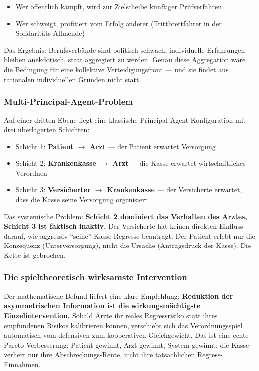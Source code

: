 \documentclass{umbruch-position}
\begin{document}
\begin{itemize}[nosep]
  \item Wer öffentlich kämpft, wird zur Zielscheibe künftiger Prüfverfahren
  \item Wer schweigt, profitiert vom Erfolg anderer (Trittbrettfahrer in der Solidaritäts-Allmende)
\end{itemize}

Das Ergebnis: Berufsverbände sind politisch schwach, individuelle Erfahrungen bleiben anekdotisch, statt aggregiert zu werden. Genau diese Aggregation wäre die Bedingung für eine kollektive Verteidigungsfront — und sie findet aus rationalen individuellen Gründen nicht statt.

\subsubsection{Multi-Principal-Agent-Problem}

Auf einer dritten Ebene liegt eine klassische Principal-Agent-Konfiguration mit drei überlagerten Schichten:

\begin{itemize}[nosep]
  \item Schicht 1: \textbf{Patient $\to$ Arzt} — der Patient erwartet Versorgung
  \item Schicht 2: \textbf{Krankenkasse $\to$ Arzt} — die Kasse erwartet wirtschaftliches Verordnen
  \item Schicht 3: \textbf{Versicherter $\to$ Krankenkasse} — der Versicherte erwartet, dass die Kasse seine Versorgung organisiert
\end{itemize}

Das systemische Problem: \textbf{Schicht 2 dominiert das Verhalten des Arztes, Schicht 3 ist faktisch inaktiv.} Der Versicherte hat keinen direkten Einfluss darauf, wie aggressiv ``seine'' Kasse Regresse beantragt. Der Patient erlebt nur die Konsequenz (Unterversorgung), nicht die Ursache (Antragsdruck der Kasse). Die Kette ist gebrochen.

\subsubsection{Die spieltheoretisch wirksamste Intervention}

Der mathematische Befund liefert eine klare Empfehlung: \textbf{Reduktion der asymmetrischen Information ist die wirkungsmächtigste Einzelintervention.} Sobald Ärzte ihr reales Regressrisiko statt ihres empfundenen Risikos kalibrieren können, verschiebt sich das Verordnungsspiel automatisch vom defensiven zum kooperativen Gleichgewicht. Das ist eine echte Pareto-Verbesserung: Patient gewinnt, Arzt gewinnt, System gewinnt; die Kasse verliert nur ihre Abschreckungs-Rente, nicht ihre tatsächlichen Regress-Einnahmen.
\end{document}
